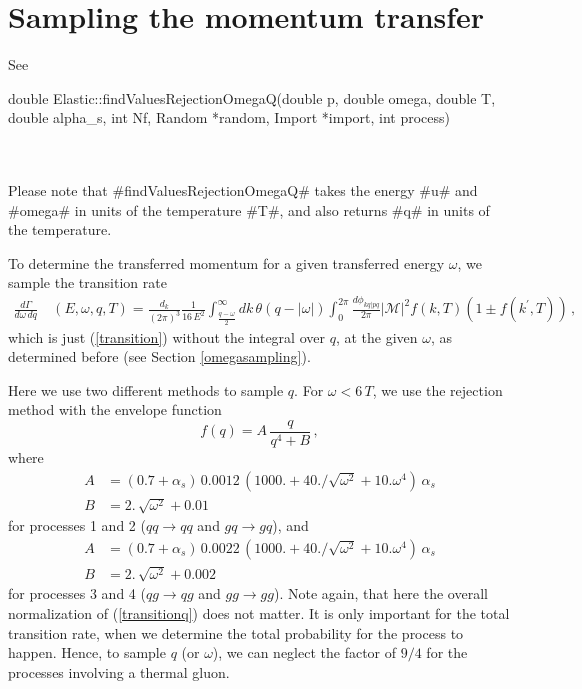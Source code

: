 \section{Sampling the momentum transfer}
See\\

\begin{boxedverbatim}
double Elastic::findValuesRejectionOmegaQ(double p, double omega, double T, 
                                          double alpha_s, int Nf, Random *random,
                                          Import *import, int process)
\end{boxedverbatim}
~\\~\\
Please note that #findValuesRejectionOmegaQ# takes the energy #u# and #omega# 
in units of the temperature #T#, and also returns #q# in units of the temperature.

To determine the transferred momentum for a given transferred energy $\omega$,
we sample the transition rate
\begin{align}\label{transitionq}
 \frac{d\Gamma}{d\omega\,dq}~&(E,\omega,q,T)=
 \frac{d_k}{(2\pi)^3}\frac{1}{16\,E^2} 
 \int_{\frac{q-\omega}{2}}^\infty dk\,\theta(q-|\omega|)
 \int_0^{2\pi}\frac{d\phi_{kq|pq}}{2\pi}|\mathcal{M}|^2 f(k,T)(1\pm f(k^\prime,T))\,,
\end{align}
which is just (\ref{transition}) without the integral over $q$, at the given $\omega$,
 as determined before (see Section \ref{omegasampling}).

Here we use two different methods to sample $q$. For $\omega<6\,T$, 
we use the rejection method with the envelope function
\begin{equation}
  f(q)=A\,\frac{q}{q^4+B}\,,
\end{equation}
where 
\begin{align}
  A &= (0.7+\alpha_s)\,0.0012\,(1000. + 40./\sqrt{\omega^2} + 10.\omega^4)\,\alpha_s\\
  B &= 2.\,\sqrt{\omega^2} + 0.01
\end{align} 
for processes 1 and 2 ($qq \rightarrow qq$ and $gq \rightarrow gq$), and
\begin{align}
  A &= (0.7+\alpha_s)\,0.0022\,(1000. + 40./\sqrt{\omega^2} + 10.\omega^4)\,\alpha_s\\
  B &= 2.\,\sqrt{\omega^2} + 0.002
\end{align} 
for processes 3 and 4 ($qg \rightarrow qg$ and $gg \rightarrow gg$).
Note again, that here the overall normalization of (\ref{transitionq}) does not matter.
It is only important for the total transition rate, when we determine the total 
probability for the process to happen. Hence, to sample $q$ (or $\omega$), we can 
neglect the factor of $9/4$ for the processes involving a thermal gluon.


